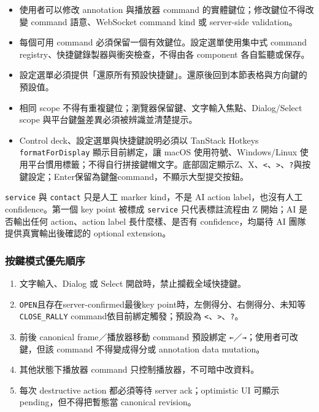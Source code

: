 \documentclass[
  9pt,
  a4paper,
]{article}
\providecommand{\tightlist}{%
  \setlength{\itemsep}{0pt}\setlength{\parskip}{0pt}}
\begin{document}
\begin{itemize}
\tightlist
\item
  使用者可以修改 annotation 與播放器 command 的實體鍵位；修改鍵位不得改變 command 語意、WebSocket command kind 或 server-side validation。
\item
  每個可用 command 必須保留一個有效鍵位。設定選單使用集中式 command registry、快捷鍵錄製器與衝突檢查，不得由各 component 各自監聽或保存。
\item
  設定選單必須提供「還原所有預設快捷鍵」。還原後回到本節表格與方向鍵的預設值。
\item
  相同 scope 不得有重複鍵位；瀏覽器保留鍵、文字輸入焦點、Dialog/Select scope 與平台鍵盤差異必須被辨識並清楚提示。
\item
  Control deck、設定選單與快捷鍵說明必須以 TanStack Hotkeys \texttt{formatForDisplay} 顯示目前綁定，讓 macOS 使用符號、Windows/Linux 使用平台慣用標籤；不得自行拼接鍵帽文字。底部固定顯示Z、X、\texttt{\textless{}}、\texttt{\textgreater{}}、\texttt{?}與按鍵設定；Enter保留為鍵盤command，不顯示大型提交按鈕。
\end{itemize}

\texttt{service} 與 \texttt{contact} 只是人工 marker kind，不是 AI
action label，也沒有人工 confidence。第一個 key point 被標成
\texttt{service} 只代表標註流程由 Z 開始；AI 是否輸出任何 action、action
label 長什麼樣、是否有 confidence，均屬待 AI 團隊提供真實輸出後確認的
optional extension。

\subsubsection{按鍵模式優先順序}\label{ux6309ux9375ux6a21ux5f0fux512aux5148ux9806ux5e8f}

\begin{enumerate}
\def\labelenumi{\arabic{enumi}.}
\tightlist
\item
  文字輸入、Dialog 或 Select 開啟時，禁止攔截全域快捷鍵。
\item
  \texttt{OPEN}且存在server-confirmed最後key point時，左側得分、右側得分、未知等
  \texttt{CLOSE\_\allowbreak{}RALLY} command依目前綁定觸發；預設為
  \texttt{\textless{}}、\texttt{\textgreater{}}、\texttt{?}。
\item
  前後 canonical frame／播放器移動 command 預設綁定
  \texttt{←}／\texttt{→}；使用者可改鍵，但該 command 不得變成得分或 annotation data mutation。
\item
  其他狀態下播放器 command 只控制播放器，不可暗中改資料。
\item
  每次 destructive action 都必須等待 server ack；optimistic UI 可顯示
  pending，但不得把暫態當 canonical revision。
\end{enumerate}
\end{document}
